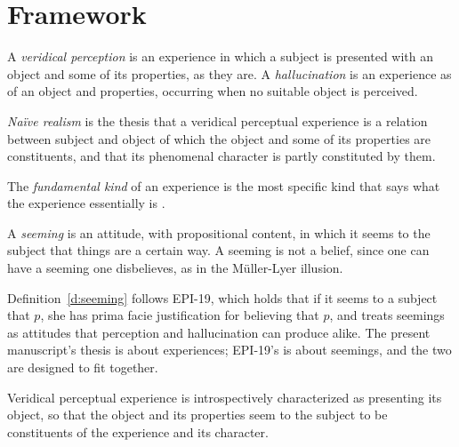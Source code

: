 \documentclass{situationist-preprint}
\begin{document}
\section{Framework}

\begin{definition}\label{d:cases}
A \emph{veridical perception} is an experience in which a subject is presented with an object and some of its properties, as they are. A \emph{hallucination} is an experience as of an object and properties, occurring when no suitable object is perceived.
\end{definition}

\begin{definition}\label{d:nr}
\emph{Naïve realism} is the thesis that a veridical perceptual experience is a relation between subject and object of which the object and some of its properties are constituents, and that its phenomenal character is partly constituted by them.
\end{definition}

\begin{definition}\label{d:kind}
The \emph{fundamental kind} of an experience is the most specific kind that says what the experience essentially is \citep{Martin2006}.
\end{definition}

\begin{definition}[Seeming]\label{d:seeming}
A \emph{seeming} is an attitude, with propositional content, in which it seems to the subject that things are a certain way. A seeming is not a belief, since one can have a seeming one disbelieves, as in the Müller-Lyer illusion.
\end{definition}

Definition~\ref{d:seeming} follows EPI-19, which holds that if it seems to a subject that $p$, she has prima facie justification for believing that $p$, and treats seemings as attitudes that perception and hallucination can produce alike. The present manuscript's thesis is about experiences; EPI-19's is about seemings, and the two are designed to fit together.

\begin{principle}\label{p:pres}
Veridical perceptual experience is introspectively characterized as presenting its object, so that the object and its properties seem to the subject to be constituents of the experience and its character.
\end{principle}
\end{document}
